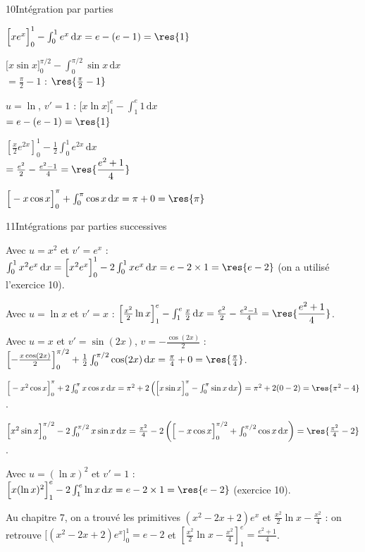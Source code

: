 \begin{deuxcolonnes}
\begin{corrige}{10}{Intégration par parties}
\begin{questions}
  \item $\Big[xe^{x}\Big]_0^1-\int_0^1e^{x}\,\mathrm{d}x=e-(e-1)=\res{1}$
  \item $\Big[x\sin x\Big]_0^{\pi/2}-\int_0^{\pi/2}\sin x\,\mathrm{d}x$\\ $=\frac{\pi}{2}-1$ : $\res{\frac{\pi}{2}-1}$
  \item $u=\ln$, $v'=1$ : $\Big[x\ln x\Big]_1^e-\int_1^e1\,\mathrm{d}x$\\ $=e-(e-1)=\res{1}$
  \item $\left[\frac x2e^{2x}\right]_0^1-\frac12\int_0^1e^{2x}\,\mathrm{d}x$\\ $=\frac{e^{2}}{2}-\frac{e^{2}-1}{4}=\res{\dfrac{e^{2}+1}{4}}$
  \item $\Big[-x\cos x\Big]_0^{\pi}+\int_0^{\pi}\cos x\,\mathrm{d}x=\pi+0=\res{\pi}$
\end{questions}
\end{corrige}

\end{deuxcolonnes}

\begin{corrige}{11}{Intégrations par parties successives}
\begin{questions}
  \item Avec $u=x^{2}$ et $v'=e^{x}$ : $\int_0^1x^{2}e^{x}\,\mathrm{d}x=\Big[x^{2}e^{x}\Big]_0^1-2\int_0^1xe^{x}\,\mathrm{d}x=e-2\times1=\res{e-2}$
    (on a utilisé l'exercice 10).
  \item Avec $u=\ln x$ et $v'=x$ : $\left[\frac{x^{2}}{2}\ln x\right]_1^e-\int_1^e\frac x2\,\mathrm{d}x=\frac{e^{2}}{2}-\frac{e^{2}-1}{4}=\res{\dfrac{e^{2}+1}{4}}$.
  \item Avec $u=x$ et $v'=\sin(2x)$, $v=-\frac{\cos(2x)}{2}$ : $\left[-\frac{x\cos(2x)}{2}\right]_0^{\pi/2}+\frac12\int_0^{\pi/2}\cos(2x)\,\mathrm{d}x=\frac{\pi}{4}+0=\res{\frac{\pi}{4}}$.
  \item $\Big[-x^{2}\cos x\Big]_0^{\pi}+2\int_0^{\pi}x\cos x\,\mathrm{d}x=\pi^{2}+2\left(\Big[x\sin x\Big]_0^{\pi}-\int_0^{\pi}\sin x\,\mathrm{d}x\right)=\pi^{2}+2(0-2)=\res{\pi^{2}-4}$.
  \item $\Big[x^{2}\sin x\Big]_0^{\pi/2}-2\int_0^{\pi/2}x\sin x\,\mathrm{d}x=\frac{\pi^{2}}{4}-2\left(\Big[-x\cos x\Big]_0^{\pi/2}+\int_0^{\pi/2}\cos x\,\mathrm{d}x\right)=\res{\frac{\pi^{2}}{4}-2}$.
  \item Avec $u=(\ln x)^{2}$ et $v'=1$ : $\Big[x(\ln x)^{2}\Big]_1^e-2\int_1^e\ln x\,\mathrm{d}x=e-2\times1=\res{e-2}$ (exercice 10).
\end{questions}
Au chapitre 7, on a trouvé les primitives $(x^{2}-2x+2)e^{x}$ et $\frac{x^{2}}{2}\ln x-\frac{x^{2}}{4}$ : on retrouve
$\Big[(x^{2}-2x+2)e^{x}\Big]_0^1=e-2$ et $\left[\frac{x^{2}}{2}\ln x-\frac{x^{2}}{4}\right]_1^e=\frac{e^{2}+1}{4}$.
\end{corrige}

